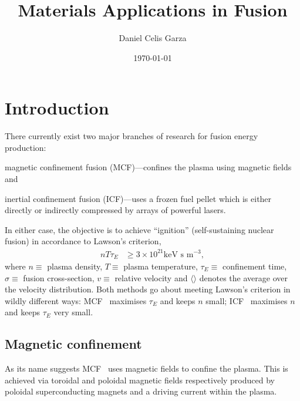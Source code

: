 \documentclass[12pt, a4paper]{article}
\title{Materials Applications in Fusion}
\author{Daniel Celis Garza}
\date{\today}
\newcommand{\mc}{MCF}
\newcommand{\ic}{ICF}
\begin{document}
	\maketitle
	\section{Introduction}
		There currently exist two major branches of research for fusion energy production:
		\begin{inparaenum}[\itshape 1)]
			\item magnetic confinement fusion (\mc)---confines the plasma using magnetic fields and
			\item inertial confinement fusion (\ic)---uses a frozen fuel pellet which is either directly or indirectly compressed by arrays of powerful lasers.
		\end{inparaenum}
		In either case, the objective is to achieve ``ignition'' (self-sustaining nuclear fusion) in accordance to Lawson's criterion,
			\begin{align}
				n T \tau_{E} &\geq 3 \times 10^{21} \textrm{keV s m$^{-3}$},
			\end{align}
		where $ n \equiv $ plasma density, $ T \equiv $ plasma temperature, $ \tau_{E} \equiv $ confinement time, $ \sigma \equiv $ fusion cross-section, $ v \equiv $ relative velocity and $ \langle \rangle $ denotes the average over the velocity distribution. Both methods go about meeting Lawson's criterion in wildly different ways: \mc~ maximises $ \tau_{E} $ and keeps $ n $ small; \ic~ maximises $ n $ and keeps $ \tau_{E} $ very small.
		\subsection{Magnetic confinement}
			As its name suggests \mc~ uses magnetic fields to confine the plasma. This is achieved via toroidal and poloidal magnetic fields respectively produced by poloidal superconducting magnets and a driving current within the plasma.
			
\end{document}
